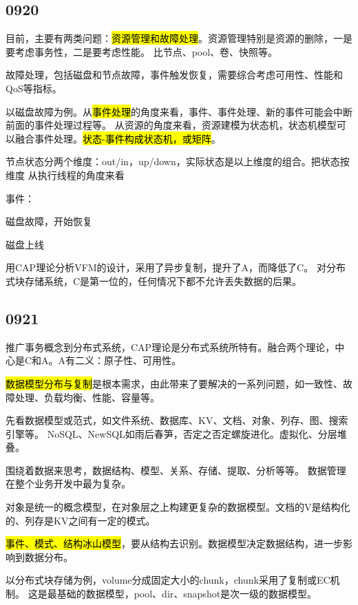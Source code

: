\subsection{0920}

目前，主要有两类问题：\hl{资源管理和故障处理}。资源管理特别是资源的删除，一是要考虑事务性，二是要考虑性能。
比节点、pool、卷、快照等。

故障处理，包括磁盘和节点故障，事件触发恢复，需要综合考虑可用性、性能和QoS等指标。

以磁盘故障为例。从\hl{事件处理}的角度来看，事件、事件处理、新的事件可能会中断前面的事件处理过程等。
从资源的角度来看，资源建模为状态机，状态机模型可以融合事件处理。\hl{状态-事件构成状态机，或矩阵}。

节点状态分两个维度：out/in，up/down，实际状态是以上维度的组合。把状态按维度 
从执行线程的角度来看

事件：
\begin{enumbox}
\item 磁盘故障，开始恢复
\item 磁盘上线
\end{enumbox}

用CAP理论分析VFM的设计，采用了异步复制，提升了A，而降低了C。
对分布式块存储系统，C是第一位的，任何情况下都不允许丢失数据的后果。

\subsection{0921}

推广事务概念到分布式系统，CAP理论是分布式系统所特有。融合两个理论，中心是C和A。A有二义：原子性、可用性。

\hl{数据模型分布与复制}是根本需求，由此带来了要解决的一系列问题，如一致性、故障处理、负载均衡、性能、容量等。

先看数据模型或范式，如文件系统、数据库、KV、文档、对象、列存、图、搜索引擎等。
NoSQL、NewSQL如雨后春笋，否定之否定螺旋进化。虚拟化、分层堆叠。

围绕着数据来思考，数据结构、模型、关系、存储、提取、分析等等。
数据管理在整个业务开发中最为复杂。

对象是统一的概念模型，在对象层之上构建更复杂的数据模型。文档的V是结构化的、列存是KV之间有一定的模式。

\hl{事件、模式、结构冰山模型}，要从结构去识别。数据模型决定数据结构，进一步影响到数据分布。

以分布式块存储为例，volume分成固定大小的chunk，chunk采用了复制或EC机制。
这是最基础的数据模型，pool、dir、snapshot是次一级的数据模型。

